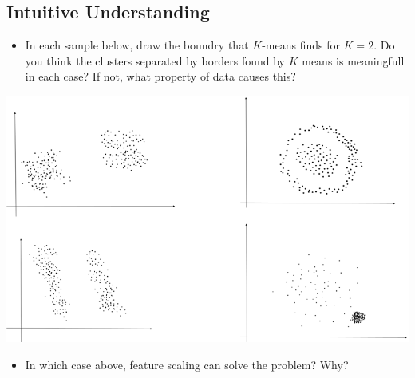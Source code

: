 \documentclass[a4paper]{article}
\begin{document}
        \subsection{Intuitive Understanding}
        \begin{itemize}
        \item In  each sample below, draw the boundry that $K$-means finds for $K=2$. Do you think the clusters separated by borders found by $K$ means is meaningfull in each case? If not, what property of data causes this?
        \end{itemize}
        \begin{center}
        \includegraphics[scale=0.5]{Q1}
        \end{center}
        
        \begin{itemize}
        \item In which case above, feature scaling can solve the problem? Why?
        \end{itemize}
         
\end{document}
